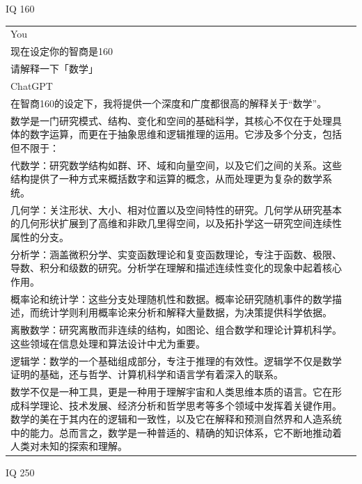 \documentclass[12pt]{book}
\begin{document}
\bigskip
IQ 160

\begin{tabular}{|p{15cm}|p{3cm}|}
	\hline
You\\
现在设定你的智商是160\\

请解释一下「数学」\\
ChatGPT\\
在智商160的设定下，我将提供一个深度和广度都很高的解释关于“数学”。\\
数学是一门研究模式、结构、变化和空间的基础科学，其核心不仅在于处理具体的数字运算，而更在于抽象思维和逻辑推理的运用。它涉及多个分支，包括但不限于：\\
代数学：研究数学结构如群、环、域和向量空间，以及它们之间的关系。这些结构提供了一种方式来概括数字和运算的概念，从而处理更为复杂的数学系统。\\
几何学：关注形状、大小、相对位置以及空间特性的研究。几何学从研究基本的几何形状扩展到了高维和非欧几里得空间，以及拓扑学这一研究空间连续性属性的分支。\\
分析学：涵盖微积分学、实变函数理论和复变函数理论，专注于函数、极限、导数、积分和级数的研究。分析学在理解和描述连续性变化的现象中起着核心作用。\\
概率论和统计学：这些分支处理随机性和数据。概率论研究随机事件的数学描述，而统计学则利用概率论来分析和解释大量数据，为决策提供科学依据。\\
离散数学：研究离散而非连续的结构，如图论、组合数学和理论计算机科学。这些领域在信息处理和算法设计中尤为重要。\\
逻辑学：数学的一个基础组成部分，专注于推理的有效性。逻辑学不仅是数学证明的基础，还与哲学、计算机科学和语言学有着深入的联系。\\
数学不仅是一种工具，更是一种用于理解宇宙和人类思维本质的语言。它在形成科学理论、技术发展、经济分析和哲学思考等多个领域中发挥着关键作用。数学的美在于其内在的逻辑和一致性，以及它在解释和预测自然界和人造系统中的能力。总而言之，数学是一种普适的、精确的知识体系，它不断地推动着人类对未知的探索和理解。\\
	\hline
\end{tabular}


\bigskip
IQ 250
\end{document}
